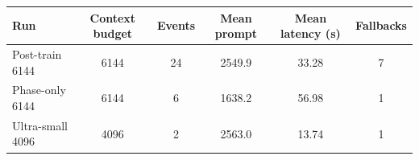 \begin{tabular}{lccccc}
\toprule
Run & Context budget & Events & Mean prompt & Mean latency (s) & Fallbacks \\
\midrule
Post-train 6144 & 6144 & 24 & 2549.9 & 33.28 & 7 \\
Phase-only 6144 & 6144 & 6 & 1638.2 & 56.98 & 1 \\
Ultra-small 4096 & 4096 & 2 & 2563.0 & 13.74 & 1 \\
\bottomrule
\end{tabular}
